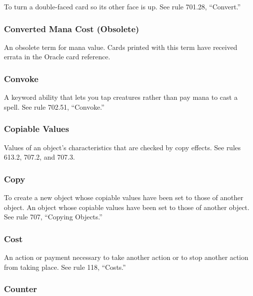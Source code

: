 {{{{{{To turn a double-faced card so its other face is up. See rule 701.28, “Convert.”

\subsubsection*{Converted Mana Cost (Obsolete)}

An obsolete term for mana value. Cards printed with this term have received errata in the Oracle card reference.

\subsubsection*{Convoke}

A keyword ability that lets you tap creatures rather than pay mana to cast a spell. See rule 702.51, “Convoke.”

\subsubsection*{Copiable Values}

Values of an object’s characteristics that are checked by copy effects. See rules 613.2, 707.2, and 707.3.

\subsubsection*{Copy}

To create a new object whose copiable values have been set to those of another object.
An object whose copiable values have been set to those of another object.
See rule 707, “Copying Objects.”

\subsubsection*{Cost}

An action or payment necessary to take another action or to stop another action from taking place. See rule 118, “Costs.”

\subsubsection*{Counter}

}}}}}}

